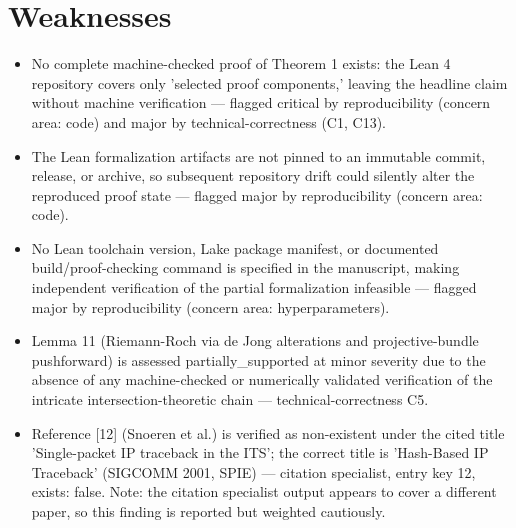 \documentclass[11pt]{article}
\begin{document}
\section*{Weaknesses}
\begin{itemize}[leftmargin=*]
  \item No complete machine-checked proof of Theorem 1 exists: the Lean 4 repository covers only 'selected proof components,' leaving the headline claim without machine verification --- flagged critical by reproducibility (concern area: code) and major by technical-correctness (C1, C13).
  \item The Lean formalization artifacts are not pinned to an immutable commit, release, or archive, so subsequent repository drift could silently alter the reproduced proof state --- flagged major by reproducibility (concern area: code).
  \item No Lean toolchain version, Lake package manifest, or documented build/proof-checking command is specified in the manuscript, making independent verification of the partial formalization infeasible --- flagged major by reproducibility (concern area: hyperparameters).
  \item Lemma 11 (Riemann-Roch via de Jong alterations and projective-bundle pushforward) is assessed partially\_supported at minor severity due to the absence of any machine-checked or numerically validated verification of the intricate intersection-theoretic chain --- technical-correctness C5.
  \item Reference [12] (Snoeren et al.) is verified as non-existent under the cited title 'Single-packet IP traceback in the ITS'; the correct title is 'Hash-Based IP Traceback' (SIGCOMM 2001, SPIE) --- citation specialist, entry key 12, exists: false. Note: the citation specialist output appears to cover a different paper, so this finding is reported but weighted cautiously.
\end{itemize}
\end{document}
